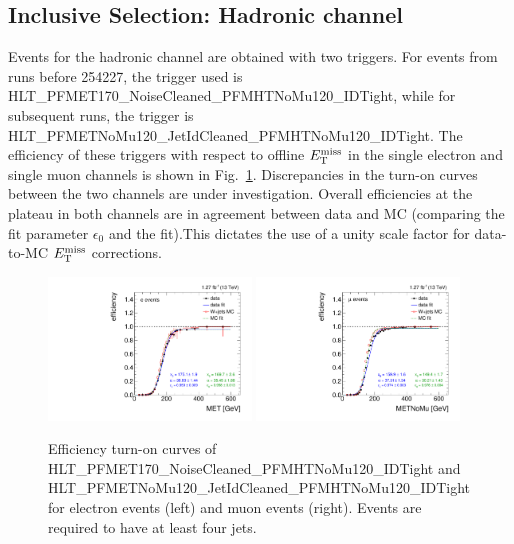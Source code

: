 \subsection{Inclusive Selection: Hadronic channel}
\label{subsec:sel_incl_hadronic}
Events for the hadronic channel are obtained with two triggers. For events from runs before 254227, the trigger used is HLT\_PFMET170\_NoiseCleaned\_PFMHTNoMu120\_IDTight, while for subsequent runs, the trigger is HLT\_PFMETNoMu120\_JetIdCleaned\_PFMHTNoMu120\_IDTight. The efficiency of these triggers with respect to offline $E_\mathrm{T}^{\mathrm{miss}}$ in the single electron and single muon channels is shown in Fig.~\ref{fig:meteff_0}. Discrepancies in the turn-on curves between the two channels are under investigation. Overall efficiencies at the plateau in both channels are in agreement between data and MC (comparing the fit parameter $\epsilon_{0}$ and the fit).This dictates the use of a unity scale factor for data-to-MC $E_\mathrm{T}^{\mathrm{miss}}$ corrections.

\begin{figure}[htbp]
\centering
\includegraphics[width=0.48\textwidth]{figures/meteff_e_1.pdf}
\includegraphics[width=0.48\textwidth]{figures/meteff_m_1.pdf}
\caption{Efficiency turn-on curves of HLT\_PFMET170\_NoiseCleaned\_PFMHTNoMu120\_IDTight and HLT\_PFMETNoMu120\_JetIdCleaned\_PFMHTNoMu120\_IDTight for electron events (left) and muon events (right). Events are required to have at least four jets.}
\label{fig:meteff_0}
\end{figure}

